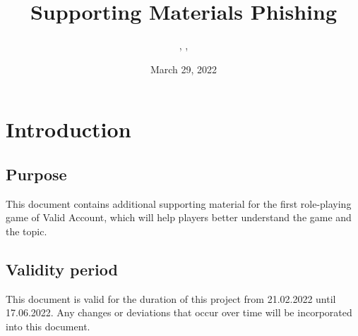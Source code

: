 \documentclass{../../../extra/styles/SecureRole}
\title{Supporting Materials Phishing}
\author{\Ba, \Wi, \Zm}
\date{March 29, 2022}
\begin{document}
\makecover
\newpage

\tableofcontents
\newpage

\chapter{Introduction}

\section{Purpose}
This document contains additional supporting material for the first role-playing game of Valid Account, which will help players better understand the game and the topic.

\section{Validity period}

This document is valid for the duration of this project from 21.02.2022 until 17.06.2022. Any changes or deviations that occur over time will be incorporated into this document.


\end{document}
